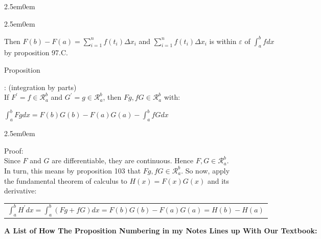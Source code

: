 \documentclass{book}
\newcommand{\hThree}{%
   \color{PineGreen!85!Orange}
   \fontsize{13}{15}\selectfont%
}
\newcommand{\exOne}{%
   \color{Purple}%
   \fontsize{14}{16}\selectfont%
}
\newenvironment{myIndent}{%
   \begin{adjustwidth}{2.5em}{0em}%
}{%
   \end{adjustwidth}%
}
\newcounter{PropNumber}
\newcommand{\propCount}[1][1]{%
   \addtocounter{PropNumber}{#1}%
   \thePropNumber%
}
\newcommand{\retTwo}{\hfill\bigbreak}
\begin{document}
{\begin{myIndent}
{\begin{myIndent}
      Then $F(b) - F(a) = \sum\limits_{i=1}^n f(t_i)\Delta x_i$ and $\sum\limits_{i=1}^n f(t_i)\Delta x_i$ is within $\varepsilon$ of $\int_a^bfdx$\\ [-6pt] by proposition 97.C.\retTwo\retTwo
   \end{myIndent}}

   Proposition \propCount: (integration by parts)\\
   If $F^\prime = f \in \mathscr{R}_a^b$ and $G^\prime = g \in \mathscr{R}_a^b$, then $Fg, fG \in \mathscr{R}_a^b$ with:
   
   {\centering $ \int_a^b Fgdx = F(b)G(b) - F(a)G(a) - \int_a^b fGdx $ \retTwo\par}
   
   {\begin{myIndent}\hThree
      Proof:\\
      Since $F$ and $G$ are differentiable, they are continuous. Hence $F, G \in \mathscr{R}_a^b$.\\ In turn, this means by proposition 103 that $Fg, fG \in \mathscr{R}_a^b$. So now, apply\\ the fundamental theorem of calculus to $H(x) = F(x)G(x)$ and its\\ derivative:
      
      \begin{center}{\fontsize{12.5}{14.5}\selectfont
         \begin{tabular}{c}
            $\int_a^b H^\prime dx = \int_a^b (Fg + fG)dx = F(b)G(b) - F(a)G(a) = H(b) - H(a)$
         \end{tabular}}
      \end{center}
   \end{myIndent}}

\end{myIndent}}

\newpage
{\huge \color{Black} \textbf{A List of How The Proposition Numbering in my Notes Lines up With Our Textbook:} \retTwo}
\exOne
\end{document}
